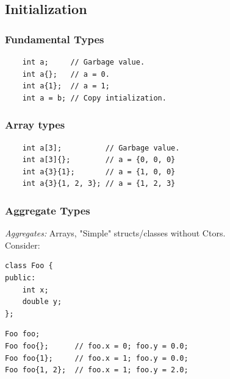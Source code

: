 \subsection{Initialization}

\subsubsection{Fundamental Types}

\begin{mdframed}[backgroundcolor=gray!10,linecolor=Firebrick4,nobreak=true]
\begin{verbatim}
    int a;     // Garbage value.
    int a{};   // a = 0.
    int a{1};  // a = 1;
    int a = b; // Copy intialization.
\end{verbatim}
\end{mdframed}


\subsubsection{Array types}

\begin{mdframed}[backgroundcolor=gray!10,linecolor=Firebrick4,nobreak=true]
\begin{verbatim}
    int a[3];          // Garbage value.
    int a[3]{};        // a = {0, 0, 0}
    int a{3}{1};       // a = {1, 0, 0}
    int a{3}{1, 2, 3}; // a = {1, 2, 3}
\end{verbatim}
\end{mdframed}

\subsubsection{Aggregate Types}
\textit{Aggregates:} Arrays, "Simple" structs/classes without Ctors.\\
Consider:
\begin{verbatim}
class Foo {
public:
    int x;
    double y;
};
\end{verbatim}

\begin{mdframed}[backgroundcolor=gray!10,linecolor=Firebrick4,nobreak=true]
\begin{verbatim}
Foo foo;
Foo foo{};      // foo.x = 0; foo.y = 0.0;
Foo foo{1};     // foo.x = 1; foo.y = 0.0;
Foo foo{1, 2};  // foo.x = 1; foo.y = 2.0;
\end{verbatim}
\end{mdframed}


